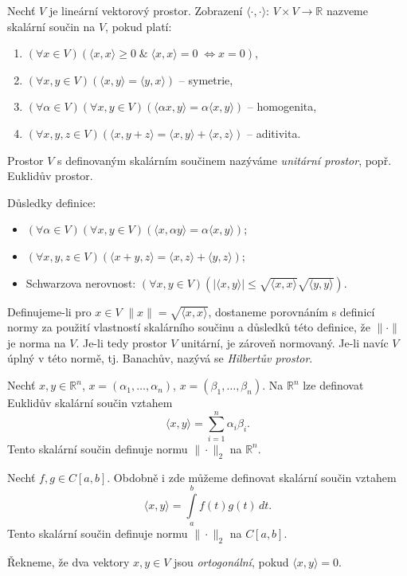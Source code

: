 Nechť $V$ je lineární vektorový prostor.
Zobrazení $\langle\cdot,\cdot\rangle:\,V\times V\rightarrow\mathbb{R}$
nazveme skalární součin na $V$, pokud platí:
\begin{enumerate}
   \item $(\forall x\in V)(\langle x,x\rangle\geq 0\;
            \&\;\langle x,x\rangle=0\;\Leftrightarrow x=0)$,
   \item $(\forall x,y\in V)(\langle x,y\rangle=\langle y,x\rangle)$ -- symetrie,
   \item $(\forall \alpha\in V)(\forall x,y\in V)
          (\langle\alpha x,y\rangle=\alpha\langle x,y\rangle)$ -- homogenita,
   \item $(\forall x,y,z\in V)
          (\langle x,y+z\rangle = \langle x,y\rangle+\langle x,z\rangle)$ 
          -- aditivita.
\end{enumerate}
Prostor $V$ s definovaným skalárním součinem nazýváme
\emph{unitární prostor}, popř. Euklidův prostor.

Důsledky definice:
\begin{itemize}
   \item $(\forall \alpha\in V)(\forall x,y\in V)
          (\langle x,\alpha y\rangle=\alpha\langle x,y\rangle)$;
   \item $(\forall x,y,z\in V)
          (\langle x+y,z\rangle = \langle x,z\rangle+\langle y,z\rangle)$;
   \item Schwarzova nerovnost: $(\forall x,y\in V)
         (|\langle x,y\rangle|\leq\sqrt{\langle x,x\rangle}\sqrt{\langle y,y\rangle})$.
\end{itemize}

Definujeme-li pro $x\in V$ $\|x\|=\sqrt{\langle x,x\rangle}$,
dostaneme porovnáním s definicí normy za použití vlastností skalárního součinu
a důsledků této definice, že $\|\cdot\|$ je norma na $V$.
Je-li tedy prostor $V$ unitární, je zároveň normovaný.
Je-li navíc $V$ úplný v této normě, tj. Banachův, nazývá se \emph{Hilbertův prostor}.

\begin{ex}
   Nechť $x,y\in\mathbb{R}^n$, $x=(\alpha_1,\ldots,\alpha_n)$,
   $x=(\beta_1,\ldots,\beta_n)$.
   Na $\mathbb{R}^n$ lze definovat Euklidův skalární součin vztahem
   \[
      \langle x,y\rangle=\sum\limits_{i=1}^n \alpha_i \beta_i.
   \]
   Tento skalární součin definuje normu $\|\cdot\|_2$ na $\mathbb{R}^n$.
\end{ex}

\begin{ex}
   Nechť $f,g\in C[a,b]$.
   Obdobně i zde můžeme definovat skalární součin vztahem
   \[
      \langle x,y\rangle=\int\limits_a^b f(t)g(t)\,dt.
   \]
   Tento skalární součin definuje normu $\|\cdot\|_2$ na $C[a,b]$.
\end{ex}

Řekneme, že dva vektory $x,y\in V$ jsou \emph{ortogonální}, 
pokud $\langle x,y\rangle=0$.


